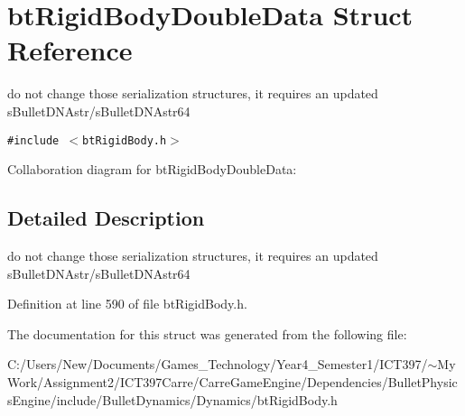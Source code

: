 \hypertarget{structbt_rigid_body_double_data}{
\section{btRigidBodyDoubleData Struct Reference}
\label{structbt_rigid_body_double_data}
}
do not change those serialization structures, it requires an updated sBulletDNAstr/sBulletDNAstr64  


{\tt \#include $<$btRigidBody.h$>$}

Collaboration diagram for btRigidBodyDoubleData:

\subsection{Detailed Description}
do not change those serialization structures, it requires an updated sBulletDNAstr/sBulletDNAstr64 

Definition at line 590 of file btRigidBody.h.

The documentation for this struct was generated from the following file:\begin{CompactItemize}
\item 
C:/Users/New/Documents/Games\_\-Technology/Year4\_\-Semester1/ICT397/$\sim$My Work/Assignment2/ICT397Carre/CarreGameEngine/Dependencies/BulletPhysicsEngine/include/BulletDynamics/Dynamics/btRigidBody.h\end{CompactItemize}
